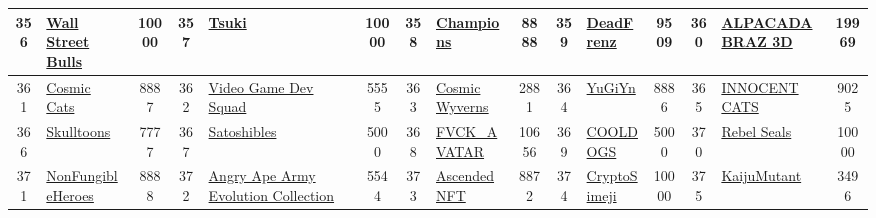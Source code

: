 \begin{table*}[]
{\begin{tabular}{|c|l|c|c|l|c|c|l|c|c|l|c|c|l|c|}
        356   & \href{https://wallstreetbulls.io}{Wall Street Bulls}                               & 10000             & 357   & \href{https://www.tsukinft.com/}{Tsuki}                                                           & 10000             & 358   & \href{https://www.cryptochampionsnft.com/}{Champions}                             & 8888              & 359   & \href{https://www.deadfellaz.io}{DeadFrenz}                                   & 9509              & 360   & \href{https://alpacadabraz.io/}{ALPACADABRAZ 3D}                                          & 19969                                   \\ \hline
        361   & \href{https://www.cosmiccats.io/}{Cosmic Cats}                                     & 8887              & 362   & \href{http://koingames.io}{Video Game Dev Squad}                                                  & 5555              & 363   & \href{https://cosmic-wyverns.io/}{Cosmic Wyverns}                                 & 2881              & 364   & \href{https://yu-gi-yn.com/}{YuGiYn}                                          & 8886              & 365   & \href{http://innocentcats.io}{INNOCENT CATS}                                              & 9025                                    \\ \hline
        366   & \href{https://opensea.io/collection/skulltoonsbytheodoru}{Skulltoons}              & 7777              & 367   & \href{https://satoshibles.com}{Satoshibles}                                                       & 5000              & 368   & \href{https://twitter.com/lvcidia}{FVCK\_AVATAR}                                  & 10656             & 369   & \href{https://cooldogs.io/}{COOLDOGS}                                         & 5000              & 370   & \href{https://rebelsclub.io}{Rebel Seals}                                                 & 10000                                   \\ \hline
        371   & \href{https://www.nfheroes.io/}{NonFungibleHeroes}                                 & 8888              & 372   & \href{https://angryapearmy.com}{Angry Ape Army Evolution Collection}                              & 5544              & 373   & \href{http://ascendednft.io}{Ascended NFT}                                        & 8872              & 374   & \href{https://www.cryptosimeji.xyz/\#/}{CryptoSimeji}                         & 10000             & 375   & \href{http://kaijukingz.io}{KaijuMutant}                                                  & 3496                                    \\ \hline

\end{tabular}}
\end{table*}
